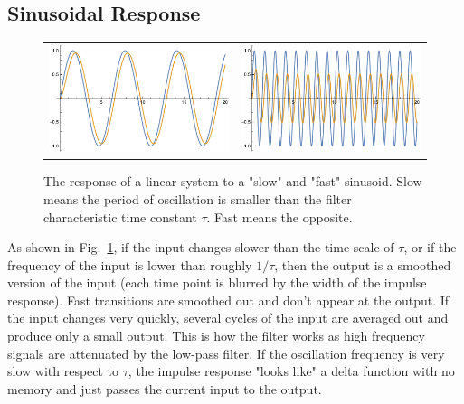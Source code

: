 \subsection{Sinusoidal Response}
\begin{figure}[tb]
\begin{center}
\begin{tabular}{cc}
\includegraphics[width=.5\columnwidth]{slow_sine.pdf} &
\includegraphics[width=.5\columnwidth]{fast_sine.pdf} \\
\end{tabular}
\end{center}
\caption{The response of a linear system to a "slow" and "fast" sinusoid.  Slow means the period of oscillation is smaller than the filter characteristic time constant $\tau$.  Fast means the opposite.}
\label{fig:fast_slow_resp}
\end{figure}
As shown in Fig.~\ref{fig:fast_slow_resp}, if the input changes slower than the time scale of $\tau$, or if the frequency of the input is lower than roughly $1/\tau$, then the output is a smoothed version of the input (each time point is blurred by the width of the impulse response).  Fast transitions are smoothed out and don't appear at the output.   If the input changes very quickly, several cycles of the input are averaged out and produce only a small output.  This is how the filter works as high frequency signals are attenuated by the low-pass filter.  If the oscillation frequency is very slow with respect to $\tau$, the impulse response "looks like" a delta function with no memory and just passes the current input to the output.

